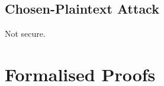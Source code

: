 \subsection{}

\subsection{Chosen-Plaintext Attack}

Not secure.


% 
% 
% 

\section{Formalised Proofs}

